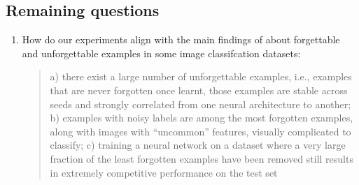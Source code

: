 \subsection{Remaining questions}
\begin{enumerate}
    \item How do our experiments align with the main findings of  about
    forgettable and unforgettable examples in some image classifcation datasets:
    \begin{quote}
        a) there exist a large number of unforgettable examples, i.e.,
examples that are never forgotten once learnt, those examples are stable across seeds and strongly
correlated from one neural architecture to another; b) examples with noisy labels are among the most
forgotten examples, along with images with “uncommon” features, visually complicated to classify;
c) training a neural network on a dataset where a very large fraction of the least forgotten examples
have been removed still results in extremely competitive performance on the test set
    \end{quote}
\end{enumerate}